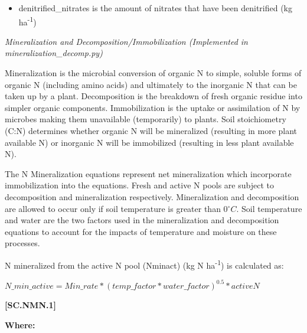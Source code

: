         \begin{itemize}
            \item denitrified\_nitrates is the amount of nitrates that have been denitrified (kg ha\textsuperscript{-1})
        \end{itemize}
        \vspace{0.5cm}

\textit{Mineralization and Decomposition/Immobilization (Implemented in mineralization\_decomp.py)}
\vspace{0.2cm}

Mineralization is the microbial conversion of organic N to simple, soluble forms of organic N (including amino acids) and ultimately to the inorganic N that can be taken up by a plant. Decomposition is the breakdown of fresh organic residue into simpler organic components. Immobilization is the uptake or assimilation of N by microbes making them unavailable (temporarily) to plants. Soil stoichiometry (C:N) determines whether organic N will be mineralized (resulting in more plant available N) or inorganic N will be immobilized (resulting in less plant available N).
\vspace{0.2cm}

The N Mineralization equations represent net mineralization which incorporate immobilization into the equations. Fresh and active N pools are subject to decomposition and mineralization respectively. Mineralization and decomposition are allowed to occur only if soil temperature is greater than 0\(^\circ C\). Soil temperature and water are the two factors used in the mineralization and decomposition equations to account for the impacts of temperature and moisture on these processes. 
\vspace{0.2cm}

N mineralized from the active N pool (Nminact) (kg N ha\textsuperscript{-1}) is calculated as:
\vspace{0.5cm}
            
    \begin{center}
\(N\_min\_active=Min\_rate * (temp\_factor * water\_factor)^{0.5} * activeN\)

    \end{center}
        \vspace{0.5cm} 
    
            {\raggedleft \textbf{[SC.NMN.1]}\par}
            \vspace{0.5cm}

        \textbf{Where:}
            
